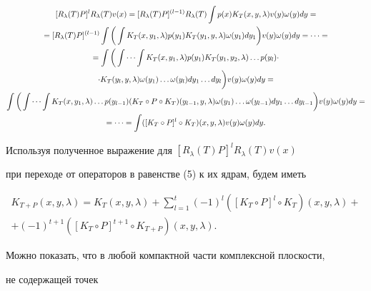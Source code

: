 \begin{multline*}


[R_\lambda(T)P]^lR_\lambda(T)v(x)=[R_\lambda(T)P]^{(l-1)}R_\lambda(T)


\int p(x)K_T(x,y,\lambda)v(y)\omega(y)dy=\\


%


=[R_\lambda(T)P]^{(l-1)}\int\bigg(\int K_T(x,y_1,\lambda)p(y_1)


K_T(y_1,y,\lambda)\omega(y_1)dy_1\bigg)v(y)\omega(y)dy=\dotsb= \\


%


=\int\bigg(\idotsint K_T(x,y_1,\lambda)p(y_1)K_T(y_1,y_2,\lambda)\dotsc


p(y_l)\cdot \\


\cdot K_T(y_l,y,\lambda)\omega(y_1)\dotsc\omega(y_l) dy_1\dotsc


dy_l\bigg)v(y)\omega(y)dy= \\


%


\int\bigg(\idotsint K_T(x,y_1,\lambda)\dotsc p(y_{l-1})(K_T\circ


P\circ K_T)(y_{l-1},y,\lambda)\omega(y_1)\dotsc\omega(y_{l-1})


dy_1\dotsc dy_{l-1}\bigg)v(y)\omega(y)dy= \\


%


=\dotsb=\int([K_T\circ P]^l\circ K_T)(x,y,\lambda)v(y)\omega(y)dy.


\end{multline*}


Используя полученное выражение для $[R_\lambda(T)P]^lR_\lambda(T)v(x)$


при переходе от операторов в равенстве (5) к их ядрам, будем иметь


\begin{multline}


K_{T+P}(x,y,\lambda)=K_T(x,y,\lambda)+


\sum_{l=1}^t(-1)^l([K_T\circ P]^l\circ K_T)(x,y,\lambda) + \\


+ (-1)^{t+1}([K_T\circ P]^{t+1}\circ K_{T+P})(x,y,\lambda).


\end{multline}


Можно показать, что в любой компактной части комплексной плоскости,


не содержащей точек


